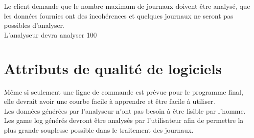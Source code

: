 \documentclass{scrreprt}
\begin{document}
Le client demande que le nombre maximum de journaux doivent être analysé, que les données fournies ont des incohérences et quelques journaux ne seront pas possibles d'analyser.\\
L'analyseur devra analyser 100%
\section{Attributs de qualité de logiciels}

Même si seulement une ligne de commande est prévue pour le programme final, elle devrait avoir une courbe facile à apprendre et être facile à utiliser.\\
Les données générées par l'analyseur n’ont pas besoin à être lisible par l'homme.\\
Les game log générés devront être analysés par l'utilisateur afin de permettre la plus grande souplesse possible dans le traitement des journaux.



\end{document}

